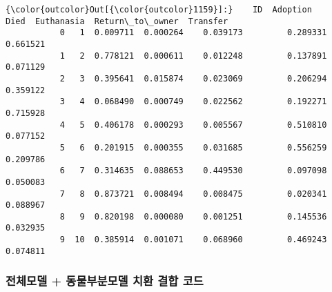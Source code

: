 \documentclass[11pt]{article}
\begin{document}
\begin{Verbatim}[commandchars=\\\{\}]
{\color{outcolor}Out[{\color{outcolor}1159}]:}    ID  Adoption      Died  Euthanasia  Return\_to\_owner  Transfer
           0   1  0.009711  0.000264    0.039173         0.289331  0.661521
           1   2  0.778121  0.000611    0.012248         0.137891  0.071129
           2   3  0.395641  0.015874    0.023069         0.206294  0.359122
           3   4  0.068490  0.000749    0.022562         0.192271  0.715928
           4   5  0.406178  0.000293    0.005567         0.510810  0.077152
           5   6  0.201915  0.000355    0.031685         0.556259  0.209786
           6   7  0.314635  0.088653    0.449530         0.097098  0.050083
           7   8  0.873721  0.008494    0.008475         0.020341  0.088967
           8   9  0.820198  0.000080    0.001251         0.145536  0.032935
           9  10  0.385914  0.001071    0.068960         0.469243  0.074811
\end{Verbatim}
            
    \subsubsection{전체모델 + 동물부분모델 치환 결합
코드}\label{uxc804uxccb4uxbaa8uxb378-uxb3d9uxbb3cuxbd80uxbd84uxbaa8uxb378-uxce58uxd658-uxacb0uxd569-uxcf54uxb4dc}
\end{document}
